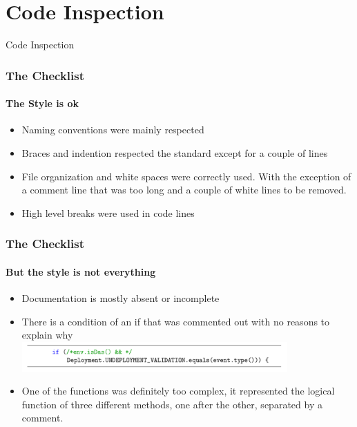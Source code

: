 \documentclass[10pt,xcolor={usenames,dvipsnames}]{beamer}
\begin{document}
\section[Section]{Code Inspection}
\begin{frame}
	\begin{center}
		Code Inspection
	\end{center}
\end{frame}
\begin{frame}
	\frametitle{The Checklist}
	\framesubtitle{The Style is ok}
	\begin{itemize}
		\item Naming conventions were mainly respected
		\item Braces and indention respected the standard except for a couple of lines
		\item File organization and white spaces were correctly used. With the exception of a comment line that was too long and a couple of white lines to be removed.
		\item High level breaks were used in code lines
	\end{itemize}
\end{frame}
\begin{frame}
	\frametitle{The Checklist}
	\framesubtitle{But the style is not everything}
	\begin{itemize}
		\item	Documentation is mostly absent or incomplete\\
		\item  There is a condition of an if that was commented out with no reasons to explain why\\
		\includegraphics[width=0.8\textwidth,height=0.8\textheight,keepaspectratio]{commento}
		\item  One of the functions was definitely too complex, it represented the logical function of three different methods, one after the other, separated by a comment.\\
	\end{itemize}
\end{frame}
\end{document}
